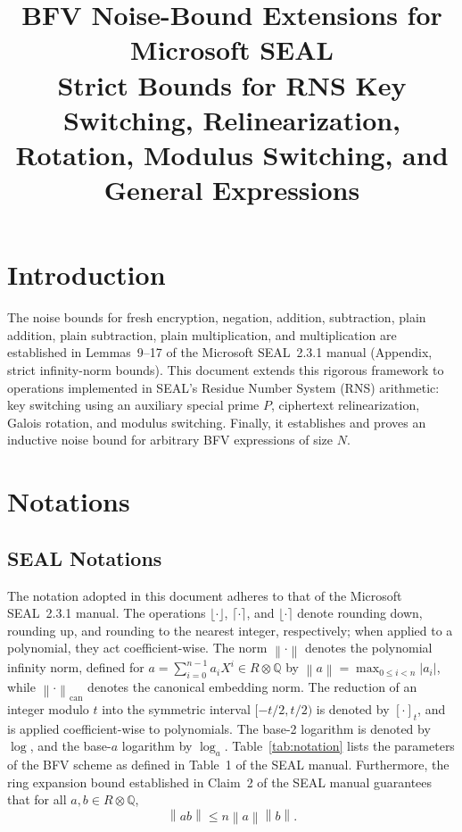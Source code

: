 \documentclass[11pt]{article}
\title{\textbf{BFV Noise-Bound Extensions for Microsoft SEAL}\\[0.3em]
       \large Strict Bounds for RNS Key Switching, Relinearization, Rotation, Modulus Switching, and General Expressions}
\author{}
\date{}
\theoremstyle{definition}
\theoremstyle{remark}
\newcommand{\norm}[1]{\left\lVert #1\right\rVert}
\begin{document}
\maketitle

\section*{Introduction}

The noise bounds for fresh encryption, negation, addition, subtraction, plain addition, plain subtraction, plain multiplication, and multiplication are established in Lemmas~9--17 of the Microsoft SEAL~2.3.1 manual (Appendix, strict infinity-norm bounds).
This document extends this rigorous framework to operations implemented in SEAL's Residue Number System (RNS) arithmetic: key switching using an auxiliary special prime $P$, ciphertext relinearization, Galois rotation, and modulus switching.
Finally, it establishes and proves an inductive noise bound for arbitrary BFV expressions of size $N$.

\section*{Notations}

\subsection*{SEAL Notations}

The notation adopted in this document adheres to that of the Microsoft SEAL~2.3.1 manual.
The operations $\lfloor \cdot \rfloor$, $\lceil \cdot \rceil$, and $\lfloor \cdot \rceil$ denote rounding down, rounding up, and rounding to the nearest integer, respectively; when applied to a polynomial, they act coefficient-wise.
The norm $\norm{\cdot}$ denotes the polynomial infinity norm, defined for $a = \sum_{i=0}^{n-1} a_i X^i \in R \otimes \mathbb{Q}$ by $\norm{a} = \max_{0 \leq i < n} |a_i|$, while $\norm{\cdot}_{\mathrm{can}}$ denotes the canonical embedding norm.
The reduction of an integer modulo $t$ into the symmetric interval $[-t/2, t/2)$ is denoted by $[\cdot]_t$, and is applied coefficient-wise to polynomials.
The base-2 logarithm is denoted by $\log$, and the base-$a$ logarithm by $\log_a$.
Table~\ref{tab:notation} lists the parameters of the BFV scheme as defined in Table~1 of the SEAL manual.
Furthermore, the ring expansion bound established in Claim~2 of the SEAL manual guarantees that for all $a, b \in R \otimes \mathbb{Q}$,
\[
  \norm{ab} \leq n \norm{a} \norm{b}.
\]
\end{document}
